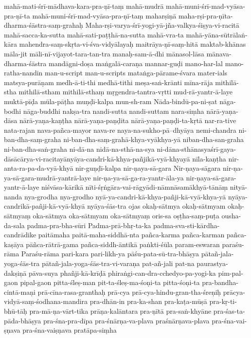 {mahā-mati-śrī-mādhava-kara-pra-ṇī-taṃ
mahā-mudrā
mahā-muni-śrī-mad-vyāsa-pra-ṇī-ta
mahā-muni-śrī-mad-vyāsa-pra-ṇī-taṃ
maharṣiṇā
maha-rṣi-pra-ṇīta-dharma-śāstra-saṃ-grahaḥ
Maha-rṣi-varya-śrī-yogi-yā-jña-valkya-śiṣya-vi-racitā
mahā-sacca-ka-sutta
mahā-sati-paṭṭhā-na-sutta
mahā-vra-ta
mahā-yāna-sūtrālaṅ-kāra
mahendra-saṃ-skṛta-vi-śva-vidyālayaḥ
maitrāya-ṇī-saṃ-hitā
maktab-khānas
māla-jit
māli-nī-vijayot-tara-tan-tra
manaḥ-sam-ā-dhi
mānasol-lāsa
mānava-dharma-śāstra
mandāgni-doṣa
maṅgalā-caraṇa
mannar-guḍi
mano-har-lal
mano-ratha-nandin
man-u-script
man-u-scripts
mataṅga-pārame-śvara
mater-ials
matsya-purāṇam
medh-ā-ti-thi
medhā-tithi
meṣa-saṅ-krānti
mīna-rāja
mithilā-stha
mithilā-stham
mithilā-sthaṃ
mṛgendra-tantra-vṛtti
mud-rā-yantr-ā-laye
muktā-pīḍa
mūla-pāṭha
muṇḍī-kalpa
mun-sh-ram
Nāda-bindū-pa-ni-ṣat
nāga-bodhi
nāga-buddhi
nakṣa-tra
nandi-sutta
nandi-suttam
nara-siṃha
nārā-yaṇa-dāsa
nārā-yaṇa-kaṇṭha
nārā-yaṇa-paṇḍita
nārā-yaṇa-paṇḍi-ta-kṛtā
nar-ra-tive
nata-rajan
nava-pañca-mayor
nava-re
naya-na-sukho-pā--dhyāya
nemi-chandra
ni-ban-dha-saṃ-graha
ni-ban-dha-saṃ-grahā-khya-vyākhya-yā
niban-dha-san-graha
ni-ban-dha-saṅ-graha
ni-dā-na
nidā-na-sthā-na-sya
ni-dāna-sthānasyaśrī-gaya-dāsācārya-vi-racitayānyāya-candri-kā-khya-pañjikā-vyā-khyayā
nīla-kaṇṭha
nir-anta-ra-pa-da-vyā-khyā
nir-guṇḍī-kalpa
nir-ṇaya-sā-gara
Nir-ṇaya-sāgara
nir-ṇa-ya-sā-gara-mudrā-yantrā-laye
nir-ṇa-ya-sā-ga-ra-yantr-āla-ya
nir-ṇaya-sā-gara-yantr-ā-laye
niśvāsa-kārikā
nīti-śṛṅgāra-vai-rāgyādi-nāmnāsamākhyā-tānāṃ
nityā-nanda
nya-grodha
nya-grodho
nyā-ya-candri-kā-khya-pañji-kā-vyā-khya-yā
nyāya-candrikā-pañji-kā-vyā-khyā
nyāya-śās-tra
ojas
okaḥ-sātmya
okaḥ-sātmyam
okaḥ-sātmyaṃ
oka-sātmya
oka-sātmyam
oka-sātmyaṃ
oris-sa
oṣṭha-saṃ-puṭa
ousha-da-sala
padma-pra-bha-sūri
Padma-prā-bhṛ-ta-ka
padma-sva-sti-kārdha-candrādike
paitāmaha
paitā-maha-siddhā-nta
pañca-karma
pañca-karman
pañca-kaṣāya
pāñca-rātrā-gama
pañca-siddh-āntikā
paṅkti-śūla
param-eswaran
paraśu-rāma
Paraśu-rāma
pari-kara
pari-likh-ya
pāśu-pata-sū-tra-bhāṣya
pātañ-jala-yoga-śās-tra
pātañ-jala-yoga-śās-tra-vi-varaṇa
pat-añ-jali
pat-na
paurastya-dakṣiṇā
pāva-suya
phañji-kā-krīḍā
phiraṅgi-can-dra-cchedyo-pa-yogi-ka
pim-pal-gaon
pipal-gaon
pitta-śleṣ-man
pit-ta-śleṣ-ma-śoṇi-ta
pitta-śoṇi-ta
pra-bandha-cintā-maṇi
prā-cīna-rasa-granthaḥ
prā-cya
prā-cya-hindu-gran-tha-śreṇiḥ
prācya-vidyā-saṃ-śodhana-mandira
pra-dhān-in
pra-ka-shan
pra-kaṭa-mūṣā
pra-kṛ-ti-bhū-tāḥ
pra-mā-ṇa-vārt-tika
prāṇa-kalāntara
pra-ṇītā
pra-saṅ-khyāne
pra-śas-ta-pāda-bhāṣya
pra-śna-pra-dīpa
pra-śnārṇa-va-plava
praśnārṇava-plava
pra-śna-vai-ṣṇava
pra-śna-vaiṣṇava
pratāpa-siṃha
}
